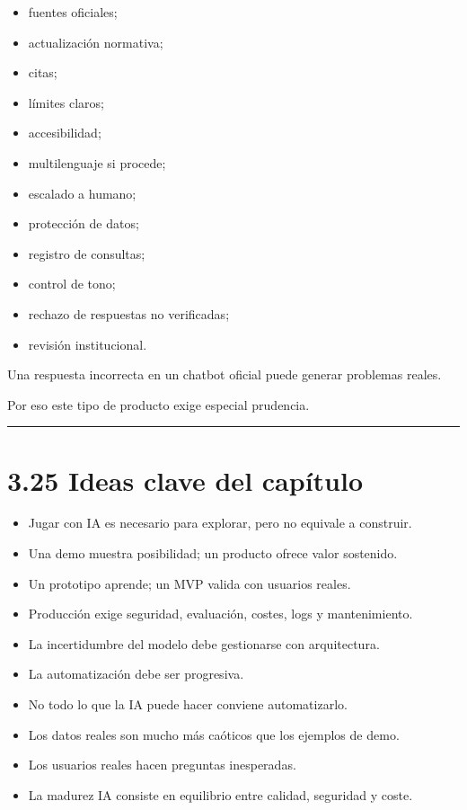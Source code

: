 \begin{itemize}
\tightlist
\item
  fuentes oficiales;
\item
  actualización normativa;
\item
  citas;
\item
  límites claros;
\item
  accesibilidad;
\item
  multilenguaje si procede;
\item
  escalado a humano;
\item
  protección de datos;
\item
  registro de consultas;
\item
  control de tono;
\item
  rechazo de respuestas no verificadas;
\item
  revisión institucional.
\end{itemize}

Una respuesta incorrecta en un chatbot oficial puede generar problemas
reales.

Por eso este tipo de producto exige especial prudencia.

\begin{center}\rule{0.5\linewidth}{0.5pt}\end{center}

\section{3.25 Ideas clave del
capítulo}\label{ideas-clave-del-capuxedtulo-2}

\begin{itemize}
\tightlist
\item
  Jugar con IA es necesario para explorar, pero no equivale a construir.
\item
  Una demo muestra posibilidad; un producto ofrece valor sostenido.
\item
  Un prototipo aprende; un MVP valida con usuarios reales.
\item
  Producción exige seguridad, evaluación, costes, logs y mantenimiento.
\item
  La incertidumbre del modelo debe gestionarse con arquitectura.
\item
  La automatización debe ser progresiva.
\item
  No todo lo que la IA puede hacer conviene automatizarlo.
\item
  Los datos reales son mucho más caóticos que los ejemplos de demo.
\item
  Los usuarios reales hacen preguntas inesperadas.
\item
  La madurez IA consiste en equilibrio entre calidad, seguridad y coste.
\end{itemize}

